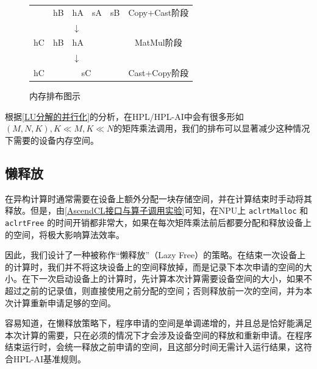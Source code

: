 \begin{figure}[h]
    \centering
    \begin{tabular}{cccccc}
        \cline{1-5}
        \multicolumn{1}{|c|}{}           & \multicolumn{1}{c|}{hB} & \multicolumn{1}{c|}{hA} & \multicolumn{1}{c|}{sA} & \multicolumn{1}{c|}{sB} & Copy+Cast阶段 \\ \cline{1-5}
        \multicolumn{5}{c}{$\downarrow$} &                                                                                                                       \\ \cline{1-5}
        \multicolumn{1}{|c|}{hC}         & \multicolumn{1}{c|}{hB} & \multicolumn{1}{c|}{hA} & \multicolumn{2}{c|}{}   & MatMul阶段                              \\ \cline{1-5}
        \multicolumn{5}{c}{$\downarrow$} &                                                                                                                       \\ \cline{1-5}
        \multicolumn{1}{|c|}{hC}         & \multicolumn{4}{c|}{sC} & Cast+Copy阶段                                                                               \\ \cline{1-5}
    \end{tabular}
    \caption{内存排布图示}
    \label{内存排布图示}
\end{figure}

根据\autoref{LU分解的并行化}的分析，在HPL/HPL-AI中会有很多形如$\left(M,N,K\right),K\ll M,K\ll N$的矩阵乘法调用，我们的排布可以显著减少这种情况下需要的设备内存空间。

\subsection{懒释放}
\label{懒释放}

在异构计算时通常需要在设备上额外分配一块存储空间，并在计算结束时手动将其释放。但是，由\autoref{AscendCL接口与算子调用实验}可知，在NPU上 \lstinline{aclrtMalloc} 和 \lstinline{aclrtFree} 的时间开销都非常大，如果在每次矩阵乘法前后都要分配和释放设备上的空间，将极大影响算法效率。

因此，我们设计了一种被称作``懒释放''（Lazy Free）的策略。在结束一次设备上的计算时，我们并不将这块设备上的空间释放掉，而是记录下本次申请的空间的大小。在下一次启动设备上的计算时，先计算本次计算需要设备空间的大小，如果不超过之前的记录值，则直接使用之前分配的空间；否则释放前一次的空间，并为本次计算重新申请足够的空间。

容易知道，在懒释放策略下，程序申请的空间是单调递增的，并且总是恰好能满足本次计算的需要，只在必须的情况下才会涉及设备空间的释放和重新申请。在程序结束运行时，会统一释放之前申请的空间，且这部分时间无需计入运行结果，这符合HPL-AI基准规则。


